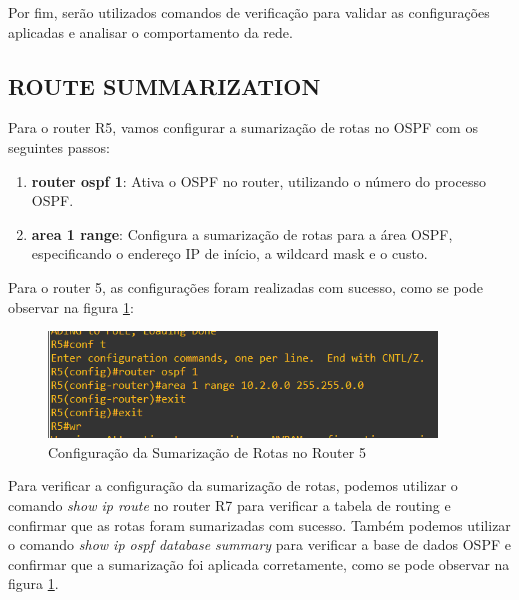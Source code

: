 \documentclass[11pt,english, openright, oneside]{book}
\begin{document}
Por fim, serão utilizados comandos de verificação para validar as configurações aplicadas e analisar o comportamento da rede.

\subsection{ROUTE SUMMARIZATION}
\vspace{0.2cm}

Para o router R5, vamos configurar a sumarização de rotas no OSPF com os seguintes passos:
\vspace{0.2cm}

\begin{enumerate}
  \item \textbf{router ospf 1}: Ativa o OSPF no router, utilizando o número do processo OSPF.
  \item \textbf{area 1 range}: Configura a sumarização de rotas para a área OSPF, especificando o endereço IP de início, a wildcard mask e o custo.
\end{enumerate}
\vspace{0.2cm}

Para o router 5, as configurações foram realizadas com sucesso, como se pode observar na figura \ref{fig:config42}:
\vspace{0.2cm}

\begin{figure}[H]
  \centering
  \includegraphics[width=0.92\textwidth]{imagens/Tarefa5/24.summarization_R5.png}
  \caption{Configuração da Sumarização de Rotas no Router 5}
  \label{fig:config42}
\end{figure}
\vspace{0.2cm}

\par Para verificar a configuração da sumarização de rotas, podemos utilizar o comando \textit{show ip route} no router R7 para verificar a tabela de routing e confirmar que as rotas foram sumarizadas com sucesso. Também podemos utilizar o comando \textit{show ip ospf database summary}
para verificar a base de dados OSPF e confirmar que a sumarização foi aplicada corretamente, como se pode observar na figura \ref{fig:config42}.
\vspace{0.2cm}
\end{document}
